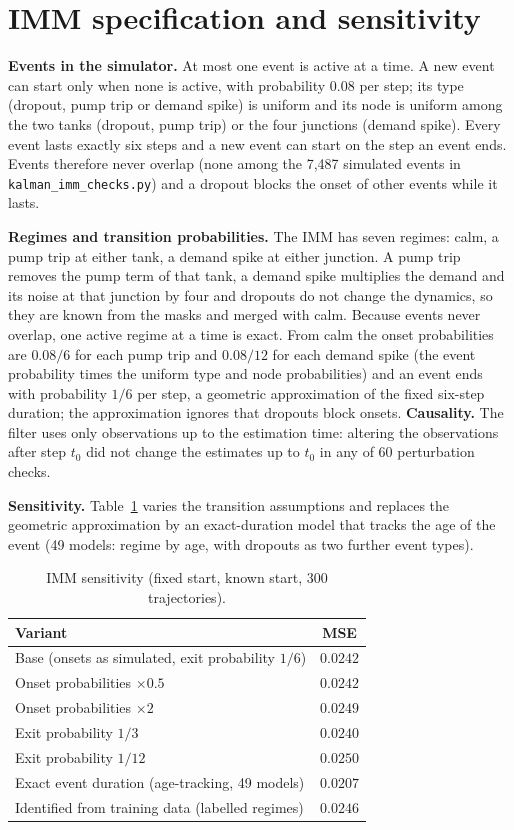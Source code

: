 \documentclass[conference]{IEEEtran}
\begin{document}
\section{IMM specification and sensitivity}
\label{sec:imm}

\textbf{Events in the simulator.} At most one event is active at a time. A new event can start only when none is active, with probability $0.08$ per step; its type (dropout, pump trip or demand spike) is uniform and its node is uniform among the two tanks (dropout, pump trip) or the four junctions (demand spike). Every event lasts exactly six steps and a new event can start on the step an event ends. Events therefore never overlap (none among the 7,487 simulated events in \texttt{kalman\_imm\_checks.py}) and a dropout blocks the onset of other events while it lasts.

\textbf{Regimes and transition probabilities.} The IMM has seven regimes: calm, a pump trip at either tank, a demand spike at either junction. A pump trip removes the pump term of that tank, a demand spike multiplies the demand and its noise at that junction by four and dropouts do not change the dynamics, so they are known from the masks and merged with calm. Because events never overlap, one active regime at a time is exact. From calm the onset probabilities are $0.08/6$ for each pump trip and $0.08/12$ for each demand spike (the event probability times the uniform type and node probabilities) and an event ends with probability $1/6$ per step, a geometric approximation of the fixed six-step duration; the approximation ignores that dropouts block onsets. \textbf{Causality.} The filter uses only observations up to the estimation time: altering the observations after step $t_0$ did not change the estimates up to $t_0$ in any of 60 perturbation checks.

\textbf{Sensitivity.} Table~\ref{tab:imm_sens} varies the transition assumptions and replaces the geometric approximation by an exact-duration model that tracks the age of the event (49 models: regime by age, with dropouts as two further event types).

\begin{table}[t]
\centering
\caption{IMM sensitivity (fixed start, known start, 300 trajectories).}
\label{tab:imm_sens}
\small
\begin{tabular}{lc}
\toprule
Variant & MSE \\
\midrule
Base (onsets as simulated, exit probability $1/6$) & $0.0242$ \\
Onset probabilities $\times0.5$ & $0.0242$ \\
Onset probabilities $\times2$ & $0.0249$ \\
Exit probability $1/3$ & $0.0240$ \\
Exit probability $1/12$ & $0.0250$ \\
Exact event duration (age-tracking, 49 models) & $\mathbf{0.0207}$ \\
Identified from training data (labelled regimes) & $0.0246$ \\
\bottomrule
\end{tabular}
\end{table}
\end{document}
